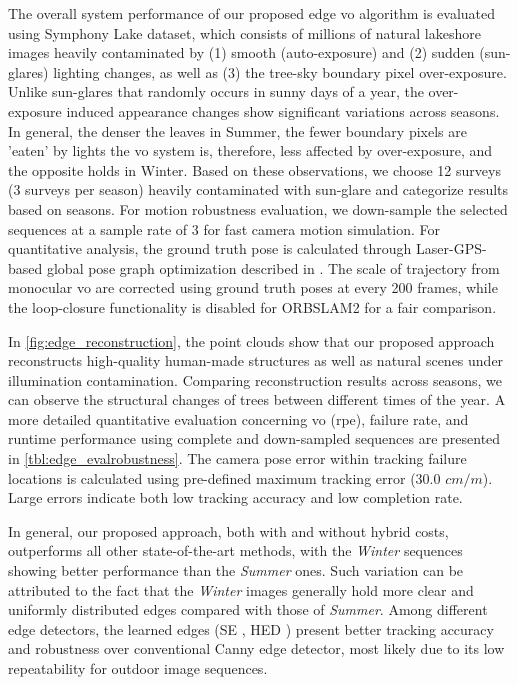 The overall system performance of our proposed edge \acrshort{vo} algorithm is evaluated using Symphony Lake \cite{griffith2017symphony} dataset, which consists of millions of natural lakeshore images heavily contaminated by (1) smooth (auto-exposure) and (2) sudden (sun-glares) lighting changes, as well as (3) the tree-sky boundary pixel over-exposure. Unlike sun-glares that randomly occurs in sunny days of a year, the over-exposure induced appearance changes show significant variations across seasons. In general, the denser the leaves in Summer, the fewer boundary pixels are 'eaten' by lights the \acrshort{vo} system is, therefore, less affected by over-exposure, and the opposite holds in Winter. Based on these observations, we choose 12 surveys (3 surveys per season) heavily contaminated with sun-glare and categorize results based on seasons. For motion robustness evaluation, we down-sample the selected sequences at a sample rate of 3 for fast camera motion simulation. For quantitative analysis, the ground truth pose is calculated through Laser-GPS-based global pose graph optimization described in \cite{pradalier2018multi}. The scale of trajectory from monocular \acrshort{vo} are corrected using ground truth poses at every 200 frames, while the loop-closure functionality is disabled for ORBSLAM2 for a fair comparison.

In \ref{fig:edge_reconstruction}, the point clouds show that our proposed approach reconstructs high-quality human-made structures as well as natural scenes under illumination contamination. 
Comparing reconstruction results across seasons, we can observe the structural changes of trees between different times of the year. 
A more detailed quantitative evaluation concerning \acrlong{vo} (\acrshort{rpe}), failure rate, and runtime performance using complete and down-sampled sequences are presented in \ref{tbl:edge_evalrobustness}. 
The camera pose error within tracking failure locations is calculated using pre-defined maximum tracking error (30.0 $cm/m$). 
Large errors indicate both low tracking accuracy and low completion rate.

In general, our proposed approach, both with and without hybrid costs, outperforms all other state-of-the-art methods, with the {\em Winter} sequences showing better performance than the {\em Summer} ones. Such variation can be attributed to the fact that the {\em Winter} images generally hold more clear and uniformly distributed edges compared with those of {\em Summer}. Among different edge detectors, the learned edges (SE \cite{dollar2013structured}, HED \cite{xie2015holistically}) present better tracking accuracy and robustness over conventional Canny edge detector, most likely due to its low repeatability for outdoor image sequences. 

